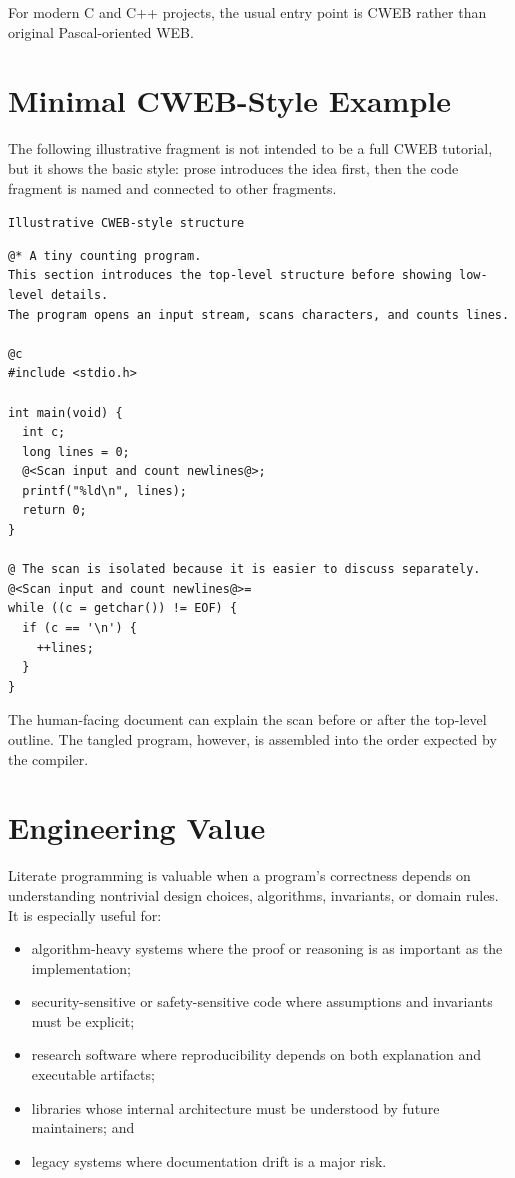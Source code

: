 \documentclass[11pt]{article}
\begin{document}
For modern C and C++ projects, the usual entry point is CWEB rather than original Pascal-oriented WEB.

\section{Minimal CWEB-Style Example}

The following illustrative fragment is not intended to be a full CWEB tutorial, but it shows the basic style: prose introduces the idea first, then the code fragment is named and connected to other fragments.

\texttt{\small Illustrative CWEB-style structure}\par
\begin{verbatim}
@* A tiny counting program.
This section introduces the top-level structure before showing low-level details.
The program opens an input stream, scans characters, and counts lines.

@c
#include <stdio.h>

int main(void) {
  int c;
  long lines = 0;
  @<Scan input and count newlines@>;
  printf("%ld\n", lines);
  return 0;
}

@ The scan is isolated because it is easier to discuss separately.
@<Scan input and count newlines@>=
while ((c = getchar()) != EOF) {
  if (c == '\n') {
    ++lines;
  }
}
\end{verbatim}

The human-facing document can explain the scan before or after the top-level outline. The tangled program, however, is assembled into the order expected by the compiler.

\section{Engineering Value}

Literate programming is valuable when a program's correctness depends on understanding nontrivial design choices, algorithms, invariants, or domain rules. It is especially useful for:

\begin{itemize}
  \item algorithm-heavy systems where the proof or reasoning is as important as the implementation;
  \item security-sensitive or safety-sensitive code where assumptions and invariants must be explicit;
  \item research software where reproducibility depends on both explanation and executable artifacts;
  \item libraries whose internal architecture must be understood by future maintainers; and
  \item legacy systems where documentation drift is a major risk.
\end{itemize}
\end{document}
